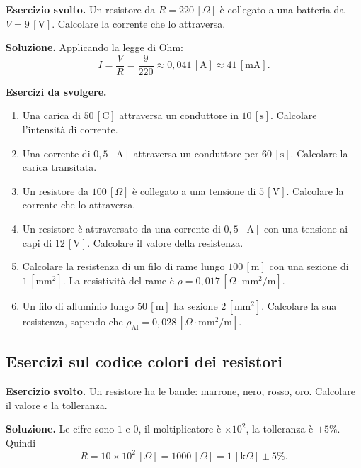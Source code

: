 \begin{esercizio}
\textbf{Esercizio svolto.} Un resistore da \(R = 220\,[\Omega]\) è collegato a una batteria da \(V = 9\,[\text{V}]\). Calcolare la corrente che lo attraversa.

\smallskip
\textbf{Soluzione.} Applicando la legge di Ohm:
\[
I = \frac{V}{R} = \frac{9}{220} \approx 0{,}041\,[\text{A}] \approx 41\,[\text{mA}].
\]
\end{esercizio}

\textbf{Esercizi da svolgere.}
\begin{enumerate}[leftmargin=1cm]
  \item Una carica di \(50\,[\text{C}]\) attraversa un conduttore in \(10\,[\text{s}]\). Calcolare l'intensità di corrente.
  \item Una corrente di \(0{,}5\,[\text{A}]\) attraversa un conduttore per \(60\,[\text{s}]\). Calcolare la carica transitata.
  \item Un resistore da \(100\,[\Omega]\) è collegato a una tensione di \(5\,[\text{V}]\). Calcolare la corrente che lo attraversa.
  \item Un resistore è attraversato da una corrente di \(0{,}5\,[\text{A}]\) con una tensione ai capi di \(12\,[\text{V}]\). Calcolare il valore della resistenza.
  \item Calcolare la resistenza di un filo di rame lungo \(100\,[\text{m}]\) con una sezione di \(1\,[\text{mm}^2]\). La resistività del rame è \(\rho = 0{,}017\,[\Omega\cdot\text{mm}^2/\text{m}]\).
  \item Un filo di alluminio lungo \(50\,[\text{m}]\) ha sezione \(2\,[\text{mm}^2]\). Calcolare la sua resistenza, sapendo che \(\rho_{\text{Al}} = 0{,}028\,[\Omega\cdot\text{mm}^2/\text{m}]\).
\end{enumerate}

\subsection{Esercizi sul codice colori dei resistori}

\begin{esercizio}
\textbf{Esercizio svolto.} Un resistore ha le bande: marrone, nero, rosso, oro. Calcolare il valore e la tolleranza.

\smallskip
\textbf{Soluzione.} Le cifre sono \(1\) e \(0\), il moltiplicatore è \(\times 10^2\), la tolleranza è \(\pm 5\%\). Quindi
\[
R = 10 \times 10^2\,[\Omega] = 1000\,[\Omega] = 1\,[\text{k}\Omega] \pm 5\%.
\]
\end{esercizio}

